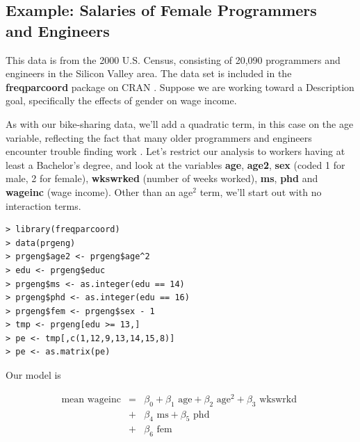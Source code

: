 \subsection{Example:  Salaries of Female Programmers \\ and Engineers}
\label{femprog}

This data is from the 2000 U.S. Census, consisting of 20,090 programmers
and engineers in the Silicon Valley area.  The data set is included in
the {\bf freqparcoord} package on CRAN \cite{freqparcoord}.  Suppose we
are working toward a Description goal, specifically the effects of
gender on wage income.

As with our bike-sharing data, we'll add a quadratic term, in this case
on the age variable, reflecting the fact that many older programmers and
engineers encounter trouble finding work \cite{mccann}.  Let's
restrict our analysis to workers having at least a Bachelor's degree,
and look at the variables {\bf age}, {\bf age2}, {\bf sex} (coded 1 for
male, 2 for female), {\bf wkswrked} (number of weeks worked), {\bf ms},
{\bf phd} and {\bf wageinc} (wage income).  Other than an age$^{2}$ term,
we'll start out with no interaction terms.

\begin{lstlisting}
> library(freqparcoord)
> data(prgeng)
> prgeng$age2 <- prgeng$age^2
> edu <- prgeng$educ
> prgeng$ms <- as.integer(edu == 14)
> prgeng$phd <- as.integer(edu == 16)
> prgeng$fem <- prgeng$sex - 1
> tmp <- prgeng[edu >= 13,]
> pe <- tmp[,c(1,12,9,13,14,15,8)]
> pe <- as.matrix(pe)
\end{lstlisting}

Our model is 

\begin{eqnarray}
\label{pefem}
\textrm{mean wageinc} 
&=& 
\beta_0 + 
\beta_1 \textrm{ age} + 
\beta_2 \textrm{ age}^2 +
\beta_3 \textrm{ wkswrkd } \nonumber \\
&+& 
\beta_4 \textrm{ ms} +
\beta_5 \textrm{ phd} \nonumber \\
&+& 
\beta_6 \textrm{ fem} 
\end{eqnarray}

